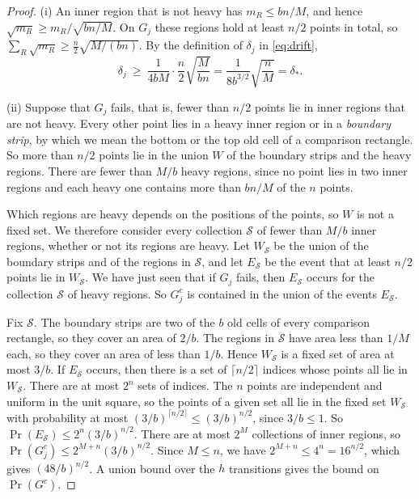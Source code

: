 \documentclass[11pt,letterpaper]{article}
\newcommand{\1}{\mathbf{1}}
\begin{document}
\begin{proof}
(i) An inner region that is not heavy has $m_R\le bn/M$, and hence $\sqrt{m_R}\ge m_R/\sqrt{bn/M}$. On $G_j$ these regions hold at least $n/2$ points in total, so $\sum_R\sqrt{m_R}\ge\frac n2\sqrt{M/(bn)}$. By the definition of $\delta_j$ in \eqref{eq:drift},
\[
\delta_j\ \ge\ \frac1{4bM}\cdot\frac n2\sqrt{\frac M{bn}}=\frac1{8b^{3/2}}\sqrt{\frac nM}=\delta_*.
\]

(ii) Suppose that $G_j$ fails, that is, fewer than $n/2$ points lie in inner regions that are not heavy. Every other point lies in a heavy inner region or in a \emph{boundary strip}, by which we mean the bottom or the top old cell of a comparison rectangle. So more than $n/2$ points lie in the union $W$ of the boundary strips and the heavy regions. There are fewer than $M/b$ heavy regions, since no point lies in two inner regions and each heavy one contains more than $bn/M$ of the $n$ points.

Which regions are heavy depends on the positions of the points, so $W$ is not a fixed set. We therefore consider every collection $\mathcal S$ of fewer than $M/b$ inner regions, whether or not its regions are heavy. Let $W_{\mathcal S}$ be the union of the boundary strips and of the regions in $\mathcal S$, and let $E_{\mathcal S}$ be the event that at least $n/2$ points lie in $W_{\mathcal S}$. We have just seen that if $G_j$ fails, then $E_{\mathcal S}$ occurs for the collection $\mathcal S$ of heavy regions. So $G_j^c$ is contained in the union of the events $E_{\mathcal S}$.

Fix $\mathcal S$. The boundary strips are two of the $b$ old cells of every comparison rectangle, so they cover an area of $2/b$. The regions in $\mathcal S$ have area less than $1/M$ each, so they cover an area of less than $1/b$. Hence $W_{\mathcal S}$ is a fixed set of area at most $3/b$. If $E_{\mathcal S}$ occurs, then there is a set of $\lceil n/2\rceil$ indices whose points all lie in $W_{\mathcal S}$. There are at most $2^n$ sets of indices. The $n$ points are independent and uniform in the unit square, so the points of a given set all lie in the fixed set $W_{\mathcal S}$ with probability at most $(3/b)^{\lceil n/2\rceil}\le(3/b)^{n/2}$, since $3/b\le1$. So $\Pr(E_{\mathcal S})\le2^n(3/b)^{n/2}$. There are at most $2^M$ collections of inner regions, so $\Pr(G_j^c)\le2^{M+n}(3/b)^{n/2}$. Since $M\le n$, we have $2^{M+n}\le4^n=16^{n/2}$, which gives $(48/b)^{n/2}$. A union bound over the $h$ transitions gives the bound on $\Pr(G^c)$.
\end{proof}
\end{document}
